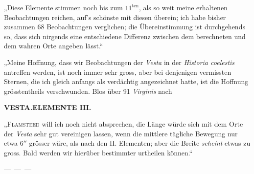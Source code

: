 \par\indent „Diese Elemente stimmen noch bis zum $11^{\text{ten}}$, als so weit meine erhaltenen Beobachtungen reichen, auf's schönste mit diesen überein; ich habe bisher zusammen 68 Beobachtungen verglichen; die Übereinstimmung ist durchgehends so, dass sich nirgends eine entschiedene Differenz zwischen dem berechneten und dem wahren Orte angeben lässt.“

\par\indent „Meine Hoffnung, dass wir Beobachtungen der \emph{Vesta} in der \emph{Historia coelestis} antreffen werden, ist noch immer sehr gross, aber bei denjenigen vermissten Sternen, die ich gleich anfangs als verdächtig angezeichnet hatte, ist die Hoffnung grösstentheils verschwunden. Blos über 91 \emph{Virginis} nach
\par\clearpage
\thispagestyle{empty}
\noindent{}%
%
\parbox[t]{\dimexpr\linewidth-24mm\relax}{\centering\footnotesize\bfseries VESTA.\quad ELEMENTE III.\par}%
\makebox[12mm][r]{}\par\nobreak\medskip
\noindent „\textsc{Flamsteed} will ich noch nicht absprechen, die Länge würde sich mit dem Orte der \emph{Vesta} sehr gut vereinigen lassen, wenn die mittlere tägliche Bewegung nur etwa $6''$ grösser wäre, als nach den II. Elementen; aber die Breite \emph{scheint} etwas zu gross. Bald werden wir hierüber bestimmter urtheilen können.“

\par\indent ---\ ---\ ---\par
\begin{flushright}
\end{flushright}
